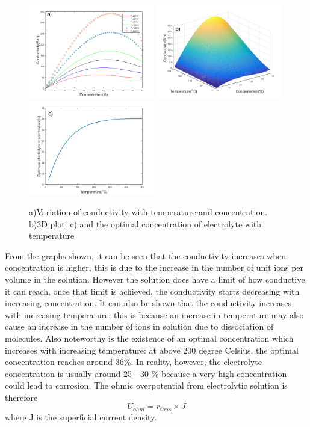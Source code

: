 \begin{figure}[h] 
\includegraphics[width=5.5cm] {cond} 
\includegraphics[width=5.5cm]{3D}
\includegraphics[width = 5.5cm]{optimum}
\caption{ a)Variation of conductivity with temperature and concentration. b)3D plot. c) and the optimal concentration of electrolyte with temperature} 
\end{figure} 
From the graphs shown, it can be seen that the conductivity increases when concentration is higher, this is due to the increase in the number of unit ions per volume in the solution. However the solution does have a limit of how conductive it can reach, once that limit is achieved, the conductivity starts decreasing with increasing concentration. It can also be shown that the conductivity increases with increasing temperature, this is because an increase in temperature may also cause an increase in the number of ions in solution due to dissociation of molecules. Also noteworthy is the existence of an optimal concentration which increases with increasing temperature: at above 200 degree Celsius, the optimal concentration reaches around 36\%. In reality, however, the electrolyte concentration is usually around 25 - 30 \% because a very high concentration could lead to corrosion.
The ohmic overpotential from electrolytic solution is therefore\
\begin{equation} 
U_{ohm} = r_{ions} \times J
\end{equation} 
where J is the superficial current density. 


